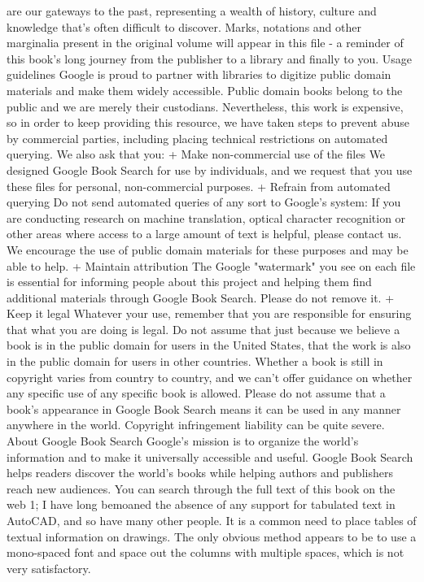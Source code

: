 \documentclass[a4paper]{article}
\begin{document}
are our gateways to the past, representing a wealth of history, culture and knowledge that's often difficult to discover. 
Marks, notations and other marginalia present in the original volume will appear in this file - a reminder of this book's long journey from the 
publisher to a library and finally to you. 
Usage guidelines 
Google is proud to partner with libraries to digitize public domain materials and make them widely accessible. Public domain books belong to the 
public and we are merely their custodians. Nevertheless, this work is expensive, so in order to keep providing this resource, we have taken steps to 
prevent abuse by commercial parties, including placing technical restrictions on automated querying. 
We also ask that you: 
+ Make non-commercial use of the files We designed Google Book Search for use by individuals, and we request that you use these files for 
personal, non-commercial purposes. 
+ Refrain from automated querying Do not send automated queries of any sort to Google's system: If you are conducting research on machine 
translation, optical character recognition or other areas where access to a large amount of text is helpful, please contact us. We encourage the 
use of public domain materials for these purposes and may be able to help. 
+ Maintain attribution The Google "watermark" you see on each file is essential for informing people about this project and helping them find 
additional materials through Google Book Search. Please do not remove it. 
+ Keep it legal Whatever your use, remember that you are responsible for ensuring that what you are doing is legal. Do not assume that just 
because we believe a book is in the public domain for users in the United States, that the work is also in the public domain for users in other 
countries. Whether a book is still in copyright varies from country to country, and we can't offer guidance on whether any specific use of 
any specific book is allowed. Please do not assume that a book's appearance in Google Book Search means it can be used in any manner 
anywhere in the world. Copyright infringement liability can be quite severe. 
About Google Book Search 
Google's mission is to organize the world's information and to make it universally accessible and useful. Google Book Search helps readers 
discover the world's books while helping authors and publishers reach new audiences. You can search through the full text of this book on the web 1; I have long bemoaned the absence of any support for tabulated text in AutoCAD, and so have many other people. It is a common need to place tables of textual information on drawings. The only obvious method appears to be to use a mono-spaced font and space out the columns with multiple spaces, which is not very satisfactory.
\end{document}
